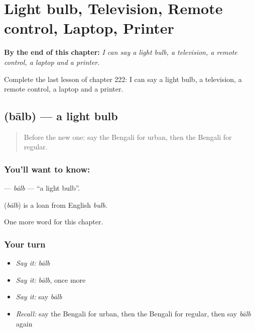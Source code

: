 
\chapter{Light bulb, Television, Remote control, Laptop, Printer}
\label{ch:bn-light-bulb-television-remote-control-laptop-printer}

\begin{chapteropening}
\textbf{By the end of this chapter:} \emph{I can say a light bulb, a television, a remote control, a laptop and a printer.}

Complete the last lesson of chapter 222: I can say a light bulb, a television, a remote control, a laptop and a printer.
\end{chapteropening}

\section[\texorpdfstring{\bn{বাল্ব} (bālb)}{বাল্ব (bālb)}]{ (bālb) — a light bulb}

\label{lesson:BN-C222-balb}



\begin{quote}
Before the new one: say the Bengali for urban, then the Bengali for regular.
\end{quote}

\subsection*{You'll want to know: }
\textbf{} — \emph{bālb} — \textquotedblleft{}a light bulb\textquotedblright{}.

\begin{cousinweb}
\textbf{} (\emph{bālb}) is a loan from English \emph{bulb}.
\end{cousinweb}

\begin{grammarlens}[title={What you've built}]
One more word for this chapter.
\end{grammarlens}

\subsection*{Your turn}
\begin{itemize}
\raggedright
  \item \emph{Say it:} \emph{bālb}
  \item \emph{Say it:} \emph{bālb}, once more
  \item \emph{Say it:} say \emph{bālb}
  \item \emph{Recall:} say the Bengali for urban, then the Bengali for regular, then say \emph{bālb} again
\end{itemize}

